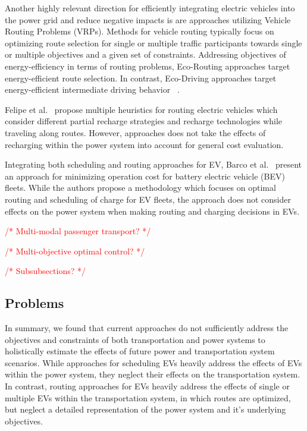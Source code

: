 \documentclass[conference]{IEEEtran}
\newcommand{\todo}[1]{\textcolor{red}{/* #1 */}}
\begin{document}
	Another highly relevant direction for efficiently integrating electric vehicles into the power grid and reduce negative impacts is are approaches utilizing Vehicle Routing Problems (VRPs). Methods for vehicle routing typically focus on optimizing route selection for single or multiple traffic participants towards single or multiple objectives and a given set of constraints. Addressing objectives of energy-efficiency in terms of routing problems, Eco-Routing approaches target energy-efficient route selection. In contrast, Eco-Driving approaches target energy-efficient intermediate driving behavior ~\cite{ericsson2006optimizing}.
	
	Felipe et al.~\cite{felipe2014heuristic} propose multiple heuristics for routing electric vehicles which consider different partial recharge strategies and recharge technologies while traveling along routes. However, approaches does not take the effects of recharging within the power system into account for general cost evaluation. 
	
	Integrating both scheduling and routing approaches for EV, Barco et al.~\cite{barco2013optimal} present an approach for minimizing operation cost for battery electric vehicle (BEV) fleets. While the authors propose a methodology which focuses on optimal routing and scheduling of charge for EV fleets, the approach does not consider effects on the power system when making routing and charging decisions in EVs.
	
	\todo{Multi-modal passenger transport?}
	
	\todo{Multi-objective optimal control?}
	
	\todo{Subsubsections?}
	
	\subsection{Problems}
	\label{problems}
	
	In summary, we found that current approaches do not sufficiently address the objectives and constraints of both transportation and power systems to holistically estimate the effects of future power and transportation system scenarios. While approaches for scheduling EVs heavily address the effects of EVs within the power system, they neglect their effects on the transportation system. In contrast, routing approaches for EVs heavily address the effects of single or multiple EVs within the transportation system, in which routes are optimized, but neglect a detailed representation of the power system and it's underlying objectives.
	
\end{document}
